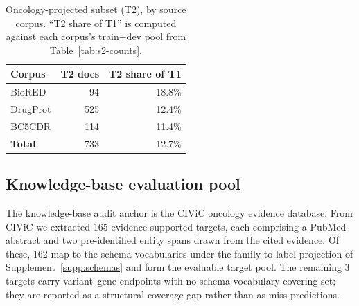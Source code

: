 \begin{table}[H]
\centering
\caption{Oncology-projected subset (T2), by source corpus.
``T2 share of T1'' is computed against each corpus's train+dev
pool from Table~\ref{tab:s2-counts}.}
\label{tab:s2-t2}
\small
\begin{tabular}{@{}lrr@{}}
\toprule
\textbf{Corpus} & \textbf{T2 docs} & \textbf{T2 share of T1} \\
\midrule
BioRED   & 94  & 18.8\% \\
DrugProt & 525 & 12.4\% \\
BC5CDR   & 114 & 11.4\% \\
\midrule
\textbf{Total} & 733 & 12.7\% \\
\bottomrule
\end{tabular}
\end{table}

\subsection{Knowledge-base evaluation pool}

The knowledge-base audit anchor is the CIViC oncology evidence
database. From CIViC we extracted 165 evidence-supported targets,
each comprising a PubMed abstract and two pre-identified entity spans
drawn from the cited evidence. Of these, 162 map to the schema
vocabularies under the family-to-label projection of
Supplement~\ref{supp:schemas} and form the evaluable target pool.
The remaining 3 targets carry variant--gene endpoints with no
schema-vocabulary covering set; they are reported as a structural
coverage gap rather than as miss predictions.